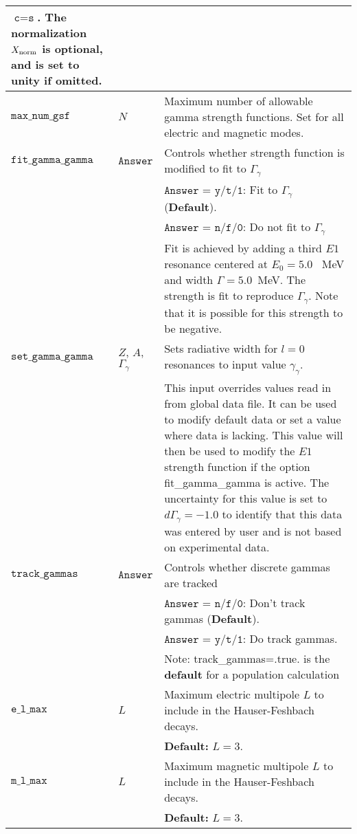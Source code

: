 \documentclass[
10pt,
showpacs,preprintnumbers,footinbib,
amsfonts,amsmath,amssymb,
aps,
prc,twocolumn,groupedaddress,superscriptaddress,
showkeys,
nofootinbib
]{revtex4-1}
\begin{document}
\begin{center}
\begin{tabular}{| p{4cm} | p{4 cm} | p{9 cm} |}
   ${\texttt{c}}={\texttt{s}}$. The normalization $X_{\rm norm}$ is optional, and is set to unity if omitted.\\ 
\hline
${\texttt{max\_num\_gsf}}$ & $N$ & Maximum number of allowable gamma strength functions. Set for all electric and magnetic modes. \\
\hline
${\texttt{fit\_gamma\_gamma}}$  &  ${\texttt{Answer}}$ &  Controls whether strength function is modified to fit to $\Gamma_\gamma$ \\
& & ${\texttt{Answer}}$ = ${\texttt{y/t/1}}$: Fit to $\Gamma_\gamma$ ({\bf Default}).\\
& & ${\texttt{Answer}}$ = ${\texttt{n/f/0}}$: Do not fit to $\Gamma_\gamma$ \\
& & Fit is achieved by adding a third $E1$ resonance centered at $E_0=5.0$~ MeV and width $\Gamma = 5.0$~MeV. The strength is fit to reproduce $\Gamma_\gamma$. Note that it is possible for this strength to be negative.\\
\hline
${\texttt{set\_gamma\_gamma}}$ & $Z$, $A$, $\Gamma_\gamma$ & Sets radiative width for $l=0$ resonances to input value $\gamma_\gamma$.\\
& & This input overrides values read in from global data file. It can be used to modify default data or set a value where data is lacking. This value will then be used to modify the $E1$ strength function if the option fit\_gamma\_gamma is active. The uncertainty for this value is set to $d\Gamma_\gamma = -1.0$ to identify that this data was entered by user and is not based on experimental data.\\
\hline
${\texttt{track\_gammas}}$  & ${\texttt{Answer}}$  &    Controls whether discrete gammas are tracked \\
 & &   ${\texttt{Answer}}$ = ${\texttt{n/f/0}}$:  Don't track gammas  ({\bf Default}).\\
  & &  ${\texttt{Answer}}$ = ${\texttt{y/t/1}}$:  Do track gammas.\\
 &  &  Note: track\_gammas=.true. is the {\bf default} for a population calculation\\
\hline
${\texttt{e\_l\_max}}$ & $L$ & Maximum electric multipole $L$ to include in the Hauser-Feshbach decays.\\
& & {\bf Default:} $L=3$.\\
\hline
${\texttt{m\_l\_max}}$ & $L$ & Maximum magnetic multipole $L$ to include in the Hauser-Feshbach decays.\\
& & {\bf Default:} $L=3$.\\
\hline
\end{tabular}
\end{center}
\end{document}
